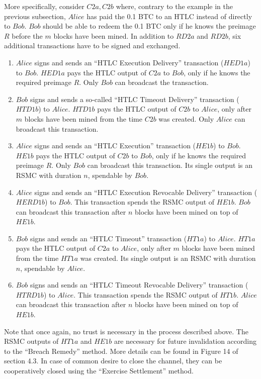     More specifically, consider $C2a, C2b$ where, contrary to the example in the previous
    subsection, $Alice$ has paid the 0.1 BTC to an HTLC instead of directly to $Bob$.
    $Bob$ should be able to redeem the 0.1 BTC only if he knows the preimage $R$ before
    the $m$ blocks have been mined. In addition to $RD2a$ and $RD2b$, six additional
    transactions have to be signed and exchanged.
    \begin{enumerate}
      \item $Alice$ signs and sends an ``HTLC Execution Delivery'' transaction ($HED1a$) to
      $Bob$. $HED1a$ pays the HTLC output of $C2a$ to $Bob$, only if he knows the required
      preimage $R$. Only $Bob$ can broadcast the transaction.
      \item $Bob$ signs and sends a so-called ``HTLC Timeout Delivery'' transaction
      ($HTD1b$) to $Alice$. $HTD1b$ pays the HTLC output of $C2b$ to $Alice$, only after
      $m$ blocks have been mined from the time $C2b$ was created. Only $Alice$ can
      broadcast this transaction.
      \item $Alice$ signs and sends an ``HTLC Execution'' transaction ($HE1b$) to $Bob$.
      $HE1b$ pays the HTLC output of $C2b$ to $Bob$, only if he knows the required
      preimage $R$. Only $Bob$ can broadcast this transaction. Its single output is an
      RSMC with duration $n$, spendable by $Bob$.
      \item $Alice$ signs and sends an ``HTLC Execution Revocable Delivery'' transaction
      ($HERD1b$) to $Bob$. This transaction spends the RSMC output of $HE1b$. $Bob$ can
      broadcast this transaction after $n$ blocks have been mined on top of $HE1b$.
      \item $Bob$ signs and sends an ``HTLC Timeout'' transaction ($HT1a$) to $Alice$.
      $HT1a$ pays the HTLC output of $C2a$ to $Alice$, only after $m$ blocks have been
      mined from the time $HT1a$ was created. Its single output is an RSMC with duration
      $n$, spendable by $Alice$.
      \item $Bob$ signs and sends an ``HTLC Timeout Revocable Delivery'' transaction
      ($HTRD1b$) to $Alice$. This transaction spends the RSMC output of $HT1b$. $Alice$
      can broadcast this transaction after $n$ blocks have been mined on top of $HE1b$.
    \end{enumerate}
    Note that once again, no trust is necessary in the process described above. The
    RSMC outputs of $HT1a$ and $HE1b$ are necessary for future invalidation according to
    the ``Breach Remedy'' method. More details can be found in Figure 14 of section 4.3. In
    case of common desire to close the channel, they can be cooperatively closed using the
    ``Exercise Settlement'' method.

